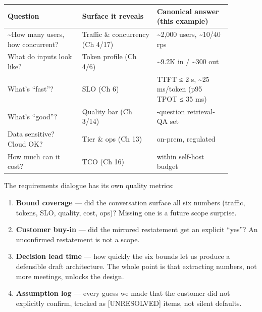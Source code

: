 \nopagebreak[4]
\begin{longtable}[]{@{}
  >{\raggedright\arraybackslash}p{0.2927\linewidth}
  >{\raggedright\arraybackslash}p{0.2927\linewidth}
  >{\raggedright\arraybackslash}p{0.2927\linewidth}@{}}
\toprule\noalign{}
\begin{minipage}[b]{\linewidth}\raggedright
Question
\end{minipage} & \begin{minipage}[b]{\linewidth}\raggedright
Surface it reveals
\end{minipage} & \begin{minipage}[b]{\linewidth}\raggedright
Canonical answer (this example)
\end{minipage} \\
\midrule\noalign{}
\endhead
\bottomrule\noalign{}
\endlastfoot
\textasciitilde How many users, how concurrent? & Traffic \& concurrency
(Ch 4/17) & \textasciitilde2,000 users, \textasciitilde10/40 rps \\
\noalign{\label{tab:23.1}}
What do inputs look like? & Token profile (Ch 4/6) & \textasciitilde9.2K
in / \textasciitilde300 out \\
What's ``fast''? & SLO (Ch 6) & TTFT ≤ 2 s, \textasciitilde25 ms/token
(p95 TPOT ≤ 35 ms) \\
What's ``good''? & Quality bar (Ch 3/14) & 50-question retrieval-QA
set \\
Data sensitive? Cloud OK? & Tier \& ops (Ch 13) & on-prem, regulated \\
How much can it cost? & TCO (Ch 16) & within self-host budget \\
\end{longtable}

\label{measurement}


The requirements dialogue has its own quality metrics:

\begin{enumerate}
\def\labelenumi{\arabic{enumi}.}
\tightlist
\item
  \textbf{Bound coverage} --- did the conversation surface all six
  numbers (traffic, tokens, SLO, quality, cost, ops)? Missing one is a
  future scope surprise.
\item
  \textbf{Customer buy-in} --- did the mirrored restatement get an
  explicit ``yes''? An unconfirmed restatement is not a scope.
\item
  \textbf{Decision lead time} --- how quickly the six bounds let us
  produce a defensible draft architecture. The whole point is that
  extracting numbers, not more meetings, unlocks the design.
\item
  \textbf{Assumption log} --- every guess we made that the customer did
  not explicitly confirm, tracked as \mbox{{[}UNRESOLVED{]}} items, not silent
  defaults.
\end{enumerate}

